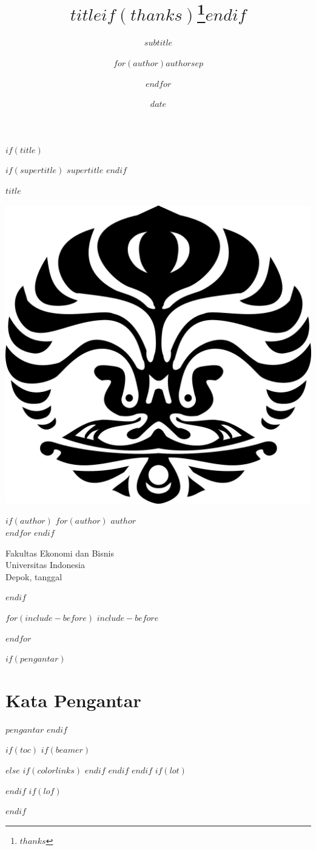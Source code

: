 \documentclass[$if(fontsize)$$fontsize$,$endif$$if(lang)$$babel-lang$,$endif$$if(papersize)$$papersize$paper,$endif$$if(beamer)$ignorenonframetext,$if(handout)$handout,$endif$$if(aspectratio)$aspectratio=$aspectratio$,$endif$$endif$$for(classoption)$$classoption$$sep$,$endfor$]{$documentclass$}
\title{$title$$if(thanks)$\thanks{$thanks$}$endif$}
\subtitle{$subtitle$}
\author{$for(author)$$author$$sep$ \and $endfor$}
\institute{$for(institute)$$institute$$sep$ \and $endfor$}
\date{$date$}
\begin{document}
$if(title)$
\begin{titlepage}
  \begin{center}
    \vspace*{1cm}

    $if(supertitle)$
    \Huge
    \textbf{$supertitle$}
    \vspace{0.5cm}
    $endif$

    \LARGE
    $title$
    \vspace{1.5cm}

    \includegraphics[width=0.3\columnwidth]{logo.png}
    \vspace{1cm}

    \large
    $if(author)$
    $for(author)$
    $author$ \\[0.2cm]
    $endfor$
    $endif$

    \vfill

    Fakultas Ekonomi dan Bisnis\\
    Universitas Indonesia\\
    Depok, tanggal \the\year
  \end{center}
\end{titlepage}
$endif$


$for(include-before)$
$include-before$

$endfor$

$if(pengantar)$
\chapter*{Kata Pengantar}
$pengantar$
$endif$

$if(toc)$
$if(beamer)$
\begin{frame}
\tableofcontents[hideallsubsections]
\end{frame}
$else$
{
$if(colorlinks)$
\hypersetup{linkcolor=$if(toccolor)$$toccolor$$else$$endif$}
$endif$
\setcounter{tocdepth}{$toc-depth$}
\tableofcontents
}
$endif$
$endif$
$if(lot)$
\listoftables
$endif$
$if(lof)$
\listoffigures
$endif$
\end{document}
